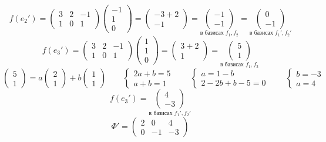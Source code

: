 $$ f(e_2') =
\begin{pmatrix}
	3 & 2 & -1 \\
    1 & 0 & 1
\end{pmatrix}
\begin{pmatrix}
    -1 \\
    1 \\
    0
\end{pmatrix} =
\begin{pmatrix}
	-3 + 2 \\
    -1
\end{pmatrix} = \underset{\text{в базисах } f_1, f_2}{
    \begin{pmatrix}
        -1 \\
        -1
    \end{pmatrix}} = \underset{\text{в базисах } f_1', f_2'}{
    \begin{pmatrix}
        0 \\
        -1
    \end{pmatrix}} $$
$$ f(e_3') =
\begin{pmatrix}
	3 & 2 & -1 \\
    1 & 0 & 1
\end{pmatrix}
\begin{pmatrix}
    1 \\
    1 \\
    0
\end{pmatrix} =
\begin{pmatrix}
	3 + 2 \\
    1
\end{pmatrix} = \underset{\text{в базисах } f_1, f_2}{
    \begin{pmatrix}
        5 \\
        1
    \end{pmatrix}} $$
$$
\begin{pmatrix}
	5 \\
    1
\end{pmatrix} = a
\begin{pmatrix}
	2 \\
    1
\end{pmatrix} + b
\begin{pmatrix}
	1 \\
    1
\end{pmatrix} \qquad
\begin{cases}
	2a + b = 5 \\
    a + b = 1
\end{cases} \qquad
\begin{cases}
	a = 1 - b \\
    2 - 2b + b - 5 = 0
\end{cases} \qquad
\begin{cases}
	b = -3 \\
    a = 4
\end{cases} $$
$$ f(e_3') = \underset{\text{в базисах } f_1', f_2'}{
    \begin{pmatrix}
        4 \\
        -3
    \end{pmatrix}} $$
$$ \Phi' =
\begin{pmatrix}
	2 & 0 & 4 \\
    0 & -1 & -3
\end{pmatrix} $$

